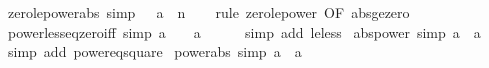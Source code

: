 \begin{isabellebody}
{\isafoldproof}%
%
\isadelimproof
\isanewline
%
\endisadelimproof
\isanewline
{}\isamarkupfalse%
\ zero{\isacharunderscore}{\kern0pt}le{\isacharunderscore}{\kern0pt}power{\isacharunderscore}{\kern0pt}abs\ {\isacharbrackleft}{\kern0pt}simp{\isacharbrackright}{\kern0pt}{\isacharcolon}{\kern0pt}\ {\isachardoublequoteopen}{}\ {\isasymle}\ {\isasymbar}a{\isasymbar}\ {\isacharcircum}{\kern0pt}\ n{\isachardoublequoteclose}\isanewline
%
\isadelimproof
\ \ %
\endisadelimproof
%
\isatagproof
{}\isamarkupfalse%
\ {\isacharparenleft}{\kern0pt}rule\ zero{\isacharunderscore}{\kern0pt}le{\isacharunderscore}{\kern0pt}power\ {\isacharbrackleft}{\kern0pt}OF\ abs{\isacharunderscore}{\kern0pt}ge{\isacharunderscore}{\kern0pt}zero{\isacharbrackright}{\kern0pt}{\isacharparenright}{\kern0pt}%
\endisatagproof
{\isafoldproof}%
%
\isadelimproof
\isanewline
%
\endisadelimproof
\isanewline
{}\isamarkupfalse%
\ power{}{\isacharunderscore}{\kern0pt}less{\isacharunderscore}{\kern0pt}eq{\isacharunderscore}{\kern0pt}zero{\isacharunderscore}{\kern0pt}iff\ {\isacharbrackleft}{\kern0pt}simp{\isacharbrackright}{\kern0pt}{\isacharcolon}{\kern0pt}\ {\isachardoublequoteopen}a\ {\isasymle}\ {}\ {\isasymlongleftrightarrow}\ a\ {\isacharequal}{\kern0pt}\ {}{\isachardoublequoteclose}\isanewline
%
\isadelimproof
\ \ %
\endisadelimproof
%
\isatagproof
{}\isamarkupfalse%
\ {\isacharparenleft}{\kern0pt}simp\ add{\isacharcolon}{\kern0pt}\ le{\isacharunderscore}{\kern0pt}less{\isacharparenright}{\kern0pt}%
\endisatagproof
{\isafoldproof}%
%
\isadelimproof
\isanewline
%
\endisadelimproof
\isanewline
{}\isamarkupfalse%
\ abs{\isacharunderscore}{\kern0pt}power{}\ {\isacharbrackleft}{\kern0pt}simp{\isacharbrackright}{\kern0pt}{\isacharcolon}{\kern0pt}\ {\isachardoublequoteopen}{\isasymbar}a\ {\isacharequal}{\kern0pt}\ a\isanewline
%
\isadelimproof
\ \ %
\endisadelimproof
%
\isatagproof
{}\isamarkupfalse%
\ {\isacharparenleft}{\kern0pt}simp\ add{\isacharcolon}{\kern0pt}\ power{}{\isacharunderscore}{\kern0pt}eq{\isacharunderscore}{\kern0pt}square{\isacharparenright}{\kern0pt}%
\endisatagproof
{\isafoldproof}%
%
\isadelimproof
\isanewline
%
\endisadelimproof
\isanewline
{}\isamarkupfalse%
\ power{}{\isacharunderscore}{\kern0pt}abs\ {\isacharbrackleft}{\kern0pt}simp{\isacharbrackright}{\kern0pt}{\isacharcolon}{\kern0pt}\ {\isachardoublequoteopen}{\isasymbar}a{\isasymbar}\ {\isacharequal}{\kern0pt}\ a\isanewline

\end{isabellebody}
